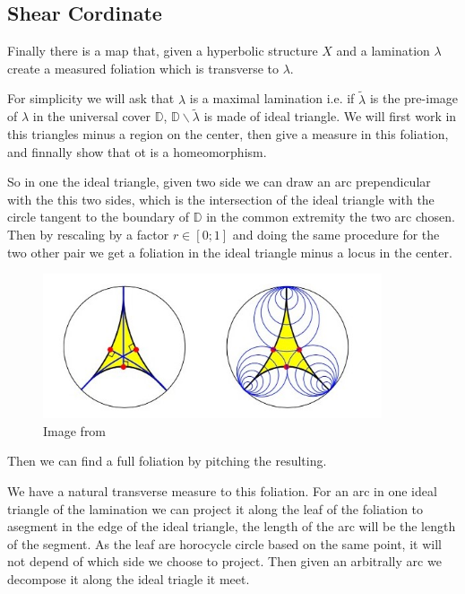 \subsection{Shear Cordinate}

Finally there is a map that, given a hyperbolic structure $X$ and a lamination $\lambda$ create a measured foliation which is transverse to $\lambda$.

For simplicity we will ask that $\lambda$ is a maximal lamination i.e. if $\tilde{\lambda}$ is the pre-image of $\lambda$ in the universal cover $\mathbb{D}$, $\mathbb{D}\backslash \tilde{\lambda}$ is made of ideal triangle. We will first work in this triangles minus a region on the center, then give a measure in this foliation, and finnally show that ot is a homeomorphism.

So in one the ideal triangle, given two side we can draw an arc prependicular with the this two sides, which is the intersection of the ideal triangle with the circle tangent to the boundary of $\mathbb{D}$ in the common extremity the two arc chosen. Then by rescaling by a factor $r \in [0;1]$ and doing the same procedure for the two other pair we get a foliation in the ideal triangle minus a locus in the center.


\begin{figure}[h!]
\centering
\includegraphics[width=10cm]{Image/FoliationTri.jpg}
\caption{Image from \cite{Martelli2016AnIT}}
\end{figure}

Then we can find a full foliation by pitching the resulting.

We have a natural transverse measure to this foliation. For an arc in one ideal triangle of the lamination we can project it along the leaf of the foliation to asegment in the edge of the ideal triangle, the length of the arc will be the length of the segment. As the leaf are horocycle circle based on the same point, it will not depend of which side we choose to project. Then given an arbitrally arc we decompose it along the ideal triagle it meet.

